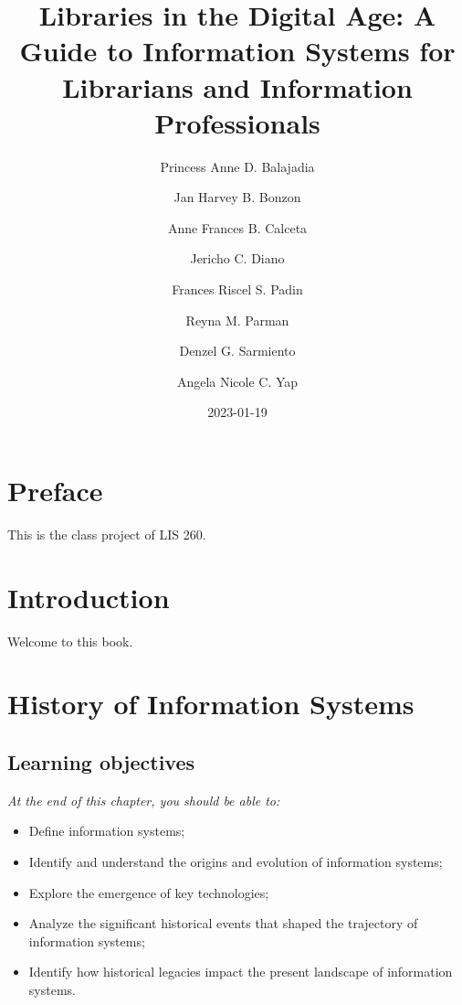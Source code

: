 \documentclass[
  letterpaper,
  DIV=11,
  numbers=noendperiod]{scrreprt}
\title{Libraries in the Digital Age: A Guide to Information Systems for
Librarians and Information Professionals}
\author{Princess Anne D. Balajadia \and Jan Harvey B. Bonzon \and Anne
Frances B. Calceta \and Jericho C. Diano \and Frances Riscel S.
Padin \and Reyna M. Parman \and Denzel G. Sarmiento \and Angela Nicole
C. Yap}
\date{2023-01-19}
\providecommand{\tightlist}{%
  \setlength{\itemsep}{0pt}\setlength{\parskip}{0pt}}\usepackage{longtable,booktabs,array}
\renewcommand*\contentsname{Table of contents}
\newcommand\contentsname{Table of contents}
\begin{document}
\maketitle

\renewcommand*\contentsname{Table of contents}
{
\hypersetup{linkcolor=}
\setcounter{tocdepth}{2}
\tableofcontents
}

\chapter*{Preface}\label{preface}


This is the class project of LIS 260.


\chapter{Introduction}\label{introduction}

Welcome to this book.


\chapter{History of Information
Systems}\label{history-of-information-systems}

\section{Learning objectives}\label{learning-objectives}

\emph{At the end of this chapter, you should be able to:}

\begin{itemize}
\tightlist
\item
  Define information systems;
\item
  Identify and understand the origins and evolution of information
  systems;
\item
  Explore the emergence of key technologies;
\item
  Analyze the significant historical events that shaped the trajectory
  of information systems;
\item
  Identify how historical legacies impact the present landscape of
  information systems.
\end{itemize}
\end{document}
